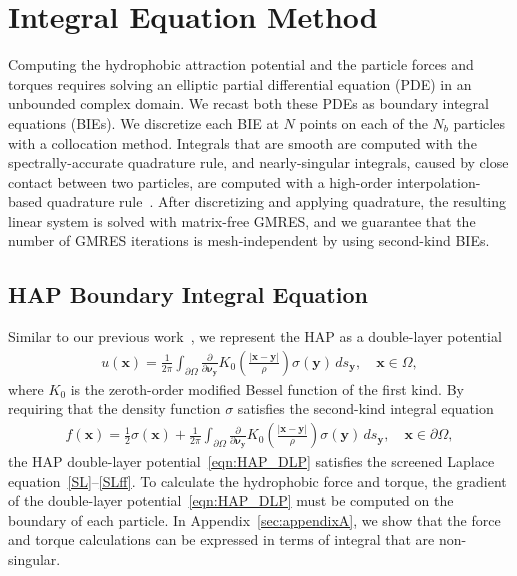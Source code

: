 \documentclass[lineno]{jfm}
\newcommand{\bd}{\partial}
\newcommand{\nnu}{\boldsymbol{\nu}}
\newcommand{\xx}{\mathbf{x}}
\newcommand{\yy}{\mathbf{y}}
\newcommand{\pderiv}[2]{\frac{\partial #1}{\partial #2}}
\begin{document}
\section{Integral Equation Method}
\label{sec:IEM}
Computing the hydrophobic attraction potential and the particle forces
and torques requires solving an elliptic partial differential equation
(PDE) in an unbounded complex domain. We recast both these PDEs as
boundary integral equations (BIEs). We discretize each BIE at $N$ points
on each of the $N_b$ particles with a collocation method. Integrals that
are smooth are computed with the spectrally-accurate quadrature rule,
and nearly-singular integrals, caused by close contact between two
particles, are computed with a high-order interpolation-based quadrature
rule~\cite{qua-bir2014}. After discretizing and applying quadrature, the
resulting linear system is solved with matrix-free GMRES, and we
guarantee that the number of GMRES iterations is mesh-independent by
using second-kind BIEs.


\subsection{HAP Boundary Integral Equation}
Similar to our previous work~\cite{Fu20}, we represent the HAP as a
double-layer potential
\begin{align}
  \label{eqn:HAP_DLP}
  u(\xx) = \frac{1}{2\pi} \int_{\bd\Omega} \pderiv{}{\nnu_\yy}
    K_0 \left(\frac{|\xx - \yy|}{\rho}\right) \sigma(\yy) \, ds_\yy,
    \quad \xx \in \Omega,
\end{align}
where $K_0$ is the zeroth-order modified Bessel function of the first
kind. By requiring that the density function $\sigma$ satisfies the
second-kind integral equation
\begin{align}
  f(\xx) = \frac{1}{2}\sigma(\xx) + 
    \frac{1}{2\pi}\int_{\bd\Omega} \pderiv{}{\nnu_\yy}
    K_0 \left(\frac{|\xx - \yy|}{\rho}\right) \sigma(\yy) \, ds_\yy,
    \quad \xx \in \bd\Omega,
\end{align}
the HAP double-layer potential~\eqref{eqn:HAP_DLP} satisfies the
screened Laplace equation~\eqref{SL}--\eqref{SLff}. To calculate the
hydrophobic force and torque, the gradient of the double-layer
potential~\eqref{eqn:HAP_DLP} must be computed on the boundary of each
particle. In Appendix~\ref{sec:appendixA}, we show that the force and
torque calculations can be expressed in terms of integral that are
non-singular.
\end{document}
